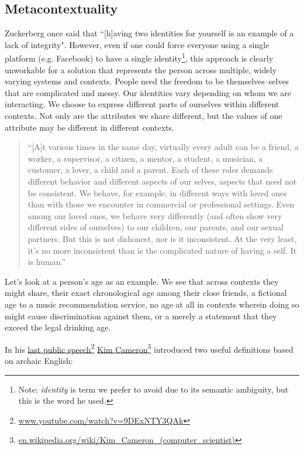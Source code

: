 \documentclass[11pt, oneside]{article}   	%
\newcommand{\hyperfootnote}[1][]{\def\ArgI{{#1}}\hyperfootnoteRelay}
\newcommand\hyperfootnoteRelay[2][]{\href{#1#2}{\ArgI}\footnote{\href{#1#2}{#2}}}
\begin{document}
\subsection{Metacontextuality}

Zuckerberg once said that ``[h]aving two identities for yourself is an example of a lack of integrity"\cite{Kirkpatrick2011}. However, even if one could force everyone using a single platform (e.g. Facebook) to have a single identity\footnote{Note: \emph{identity} is term we prefer to avoid due to its semantic ambiguity, but this is the word he used.}, this approach is clearly unworkable for a solution that represents the person across multiple, widely varying systems and contexts. People need the freedom to be themselves--selves that are complicated and messy. Our identities vary depending on whom we are interacting. We choose to express different parts of ourselves within different contexts. Not only are the attributes we share different, but the values of one attribute may be different in different contexts. 

\begin{quote} 
	``[A]t various times in the same day, virtually every adult can be a friend, a worker, a supervisor, a citizen, a mentor, a student, a musician, a customer, a lover, a child and a parent. Each of these roles demands different behavior and different aspects of our selves, aspects that need not be consistent. We behave, for example, in different ways with loved ones than with those we encounter in commercial or professional settings. Even among our loved ones, we behave very differently (and often show very different sides of ourselves) to our children, our parents, and our sexual partners. But this is not dishonest, nor is it inconsistent. At the very least, it's no more inconsistent than is the complicated nature of having a self. It is human.''\cite[p122]{Richards2021}
\end{quote}

Let's look at a person's age as an example. We see that across contexts they might share, their exact chronological age among their close friends, a fictional age to a music recommendation service, no age at all in contexts wherein doing so might cause discrimination against them, or a merely a statement that they exceed the legal drinking age. 

In his \hyperfootnote[last public speech][https://]{www.youtube.com/watch?v=9DExNTY3QAk}  
\hyperfootnote[Kim Cameron][https://]{en.wikipedia.org/wiki/Kim\_Cameron\_(computer\_scientist)} introduced two useful definitions based on archaic English:
\end{document}
